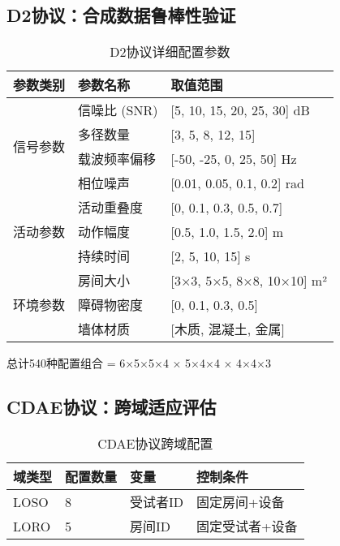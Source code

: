 \subsection{D2协议：合成数据鲁棒性验证}
\label{app:d2_protocol}

\begin{table}[h]
\centering
\caption{D2协议详细配置参数}
\label{tab:d2_config_details}
\begin{tabular}{lll}
\toprule
\textbf{参数类别} & \textbf{参数名称} & \textbf{取值范围} \\
\midrule
\multirow{4}{*}{信号参数} 
& 信噪比 (SNR) & [5, 10, 15, 20, 25, 30] dB \\
& 多径数量 & [3, 5, 8, 12, 15] \\
& 载波频率偏移 & [-50, -25, 0, 25, 50] Hz \\
& 相位噪声 & [0.01, 0.05, 0.1, 0.2] rad \\
\midrule
\multirow{3}{*}{活动参数}
& 活动重叠度 & [0, 0.1, 0.3, 0.5, 0.7] \\
& 动作幅度 & [0.5, 1.0, 1.5, 2.0] m \\
& 持续时间 & [2, 5, 10, 15] s \\
\midrule
\multirow{3}{*}{环境参数}
& 房间大小 & [3×3, 5×5, 8×8, 10×10] m² \\
& 障碍物密度 & [0, 0.1, 0.3, 0.5] \\
& 墙体材质 & [木质, 混凝土, 金属] \\
\bottomrule
\end{tabular}
\end{table}

总计540种配置组合 = 6×5×5×4 × 5×4×4 × 4×4×3

\subsection{CDAE协议：跨域适应评估}
\label{app:cdae_protocol}

\begin{table}[h]
\centering
\caption{CDAE协议跨域配置}
\label{tab:cdae_domains}
\begin{tabular}{llll}
\toprule
\textbf{域类型} & \textbf{配置数量} & \textbf{变量} & \textbf{控制条件} \\
\midrule
LOSO & 8 & 受试者ID & 固定房间+设备 \\
LORO & 5 & 房间ID & 固定受试者+设备 \\
\bottomrule
\end{tabular}
\end{table}

